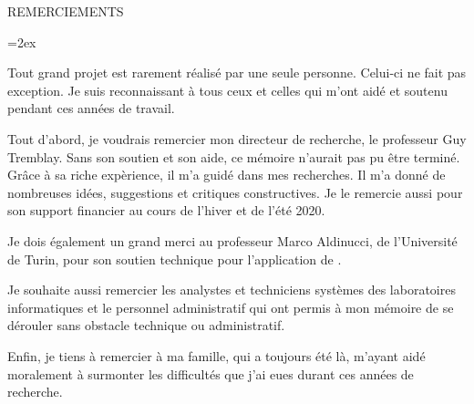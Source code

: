 
   \parskip=0pt
   \vspace*{0.1 truecm} 
   \begin{center}
    {\uppercase { REMERCIEMENTS }}\par
   \end{center}
   \nobreak \vspace*{1.10 truecm}
   \parskip=2ex






Tout grand projet est rarement r\'ealis\'e par une seule personne. Celui-ci ne fait pas exception. Je suis reconnaissant \`a tous ceux et celles qui m'ont aid\'e et soutenu pendant ces ann\'ees de travail.

Tout d'abord, je voudrais remercier mon directeur de recherche, le professeur Guy Tremblay. Sans son soutien et son aide, ce m\'emoire n'aurait pas pu \^etre termin\'e. Gr\^ace \`a sa riche exp\`erience, il m'a guid\'e dans mes recherches. Il m'a donn\'e de nombreuses id\'ees, suggestions et critiques constructives.
%
Je le remercie aussi pour son support financier au cours de l'hiver et de l'été 2020.

Je dois \'egalement un grand merci au professeur Marco Aldinucci, de l'Universit\'e de Turin, pour son soutien technique pour l'application de . 

Je souhaite aussi remercier les analystes et techniciens syst\`emes des laboratoires informatiques et le personnel administratif qui ont permis \`a mon m\'emoire de se d\'erouler sans obstacle technique ou administratif.

Enfin, je tiens \`a remercier \`a ma famille, qui a toujours \'et\'e l\`a, m'ayant aid\'e moralement \`a surmonter les difficult\'es que j'ai eues durant ces ann\'ees de recherche. 


